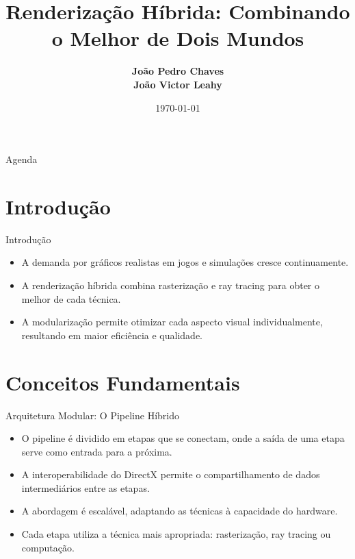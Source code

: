 \documentclass[aspectratio=169,xcolor=table]{beamer}
\author[Chaves, Leahy]{%
  \textbf{João Pedro Chaves} \\
  \textbf{João Victor Leahy}
}
\title{Renderização Híbrida: Combinando o Melhor de Dois Mundos}
\institute{Universidade Federal da Bahia \\ Instituto de Computação}
\date{\today}
\begin{document}
\begin{frame}
    \titlepage
\end{frame}

\begin{frame}{Agenda}
    \tableofcontents[hideallsubsections]
\end{frame}

\section{Introdução}
\begin{frame}{Introdução}
    \begin{itemize}
        \item A demanda por gráficos realistas em jogos e simulações cresce continuamente.
        \item A renderização híbrida combina rasterização e ray tracing para obter o melhor de cada técnica.
        \item A modularização permite otimizar cada aspecto visual individualmente, resultando em maior eficiência e qualidade.
    \end{itemize}
\end{frame}

\section{Conceitos Fundamentais}
\begin{frame}{Arquitetura Modular: O Pipeline Híbrido}
    \begin{itemize}
        \item O pipeline é dividido em etapas que se conectam, onde a saída de uma etapa serve como entrada para a próxima.
        \item A interoperabilidade do DirectX permite o compartilhamento de dados intermediários entre as etapas.
        \item A abordagem é escalável, adaptando as técnicas à capacidade do hardware.
        \item Cada etapa utiliza a técnica mais apropriada: rasterização, ray tracing ou computação.
    \end{itemize}
\end{frame}
\end{document}
